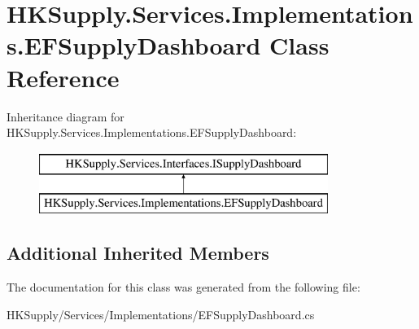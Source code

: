 \hypertarget{class_h_k_supply_1_1_services_1_1_implementations_1_1_e_f_supply_dashboard}{}\section{H\+K\+Supply.\+Services.\+Implementations.\+E\+F\+Supply\+Dashboard Class Reference}
\label{class_h_k_supply_1_1_services_1_1_implementations_1_1_e_f_supply_dashboard}
Inheritance diagram for H\+K\+Supply.\+Services.\+Implementations.\+E\+F\+Supply\+Dashboard\+:\begin{figure}[H]
\begin{center}
\leavevmode
\includegraphics[height=2.000000cm]{class_h_k_supply_1_1_services_1_1_implementations_1_1_e_f_supply_dashboard}
\end{center}
\end{figure}
\subsection*{Additional Inherited Members}


The documentation for this class was generated from the following file\+:\begin{DoxyCompactItemize}
\item 
H\+K\+Supply/\+Services/\+Implementations/E\+F\+Supply\+Dashboard.\+cs\end{DoxyCompactItemize}
